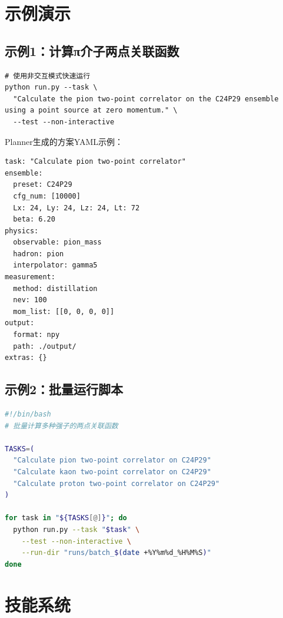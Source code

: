 \documentclass[12pt,a4paper]{ctexart}
\begin{document}
\section{示例演示}

\subsection{示例1：计算π介子两点关联函数}

\begin{lstlisting}[caption={运行π介子两点关联函数计算}]
# 使用非交互模式快速运行
python run.py --task \
  "Calculate the pion two-point correlator on the C24P29 ensemble using a point source at zero momentum." \
  --test --non-interactive
\end{lstlisting}

Planner生成的方案YAML示例：
\begin{lstlisting}[caption={Planner输出的plan.yaml示例}]
task: "Calculate pion two-point correlator"
ensemble:
  preset: C24P29
  cfg_num: [10000]
  Lx: 24, Ly: 24, Lz: 24, Lt: 72
  beta: 6.20
physics:
  observable: pion_mass
  hadron: pion
  interpolator: gamma5
measurement:
  method: distillation
  nev: 100
  mom_list: [[0, 0, 0, 0]]
output:
  format: npy
  path: ./output/
extras: {}
\end{lstlisting}

\subsection{示例2：批量运行脚本}

\begin{lstlisting}[caption={批量运行实验脚本示例}, language=bash]
#!/bin/bash
# 批量计算多种强子的两点关联函数

TASKS=(
  "Calculate pion two-point correlator on C24P29"
  "Calculate kaon two-point correlator on C24P29"
  "Calculate proton two-point correlator on C24P29"
)

for task in "${TASKS[@]}"; do
  python run.py --task "$task" \
    --test --non-interactive \
    --run-dir "runs/batch_$(date +%Y%m%d_%H%M%S)"
done
\end{lstlisting}

\section{技能系统}
\end{document}
